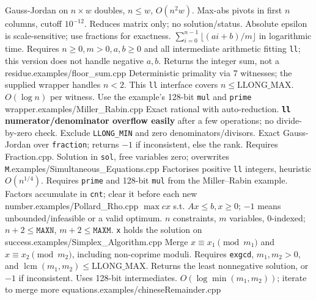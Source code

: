 {Gauss-Jordan on $n\times w$ doubles, $n\le w$, $O(n^2w)$. Max-abs pivots in first $n$ columns, cutoff $10^{-12}$. Reduces matrix only; no solution/status. Absolute epsilon is scale-sensitive; use fractions for exactness.}
%
{$\sum_{i=0}^{n-1}\lfloor(ai+b)/m\rfloor$ in logarithmic time. Requires $n\ge0,m>0,a,b\ge0$ and all intermediate arithmetic fitting \texttt{ll}; this version does not handle negative $a,b$. Returns the integer sum, not a residue.}{examples/floor_sum.cpp}
%
{Deterministic primality via 7 witnesses; the supplied wrapper handles $n<2$. This \texttt{ll} interface covers $n\le\mathrm{LLONG\_MAX}$. $O(\log n)$ per witness. Use the example's 128-bit \texttt{mul} and \texttt{prime} wrapper.}{examples/Miller_Rabin.cpp}
%
{Exact rational with auto-reduction. \textbf{\texttt{ll} numerator/denominator overflow easily} after a few operations; no divide-by-zero check. Exclude \texttt{LLONG\_MIN} and zero denominators/divisors.}
%
{Exact Gauss-Jordan over \texttt{fraction}; returns $-1$ if inconsistent, else the rank. Requires Fraction.cpp. Solution in \texttt{sol}, free variables zero; overwrites \texttt{M}.}{examples/Simultaneous_Equations.cpp}
%
{Factorises positive \texttt{ll} integers, heuristic $O(n^{1/4})$. Requires \texttt{prime} and 128-bit \texttt{mul} from the Miller--Rabin example. Factors accumulate in \texttt{cnt}; clear it before each new number.}{examples/Pollard_Rho.cpp}
%
{$\max cx$ s.t. $Ax\le b,x\ge0$; $-1$ means unbounded/infeasible or a valid optimum. $n$ constraints, $m$ variables, 0-indexed; $n+2\le\texttt{MAXN}$, $m+2\le\texttt{MAXM}$. \texttt{x} holds the solution on success.}{examples/Simplex_Algorithm.cpp}
%
{Merge $x\equiv x_1\pmod{m_1}$ and $x\equiv x_2\pmod{m_2}$, including non-coprime moduli. Requires \texttt{exgcd}, $m_1,m_2>0$, and $\operatorname{lcm}(m_1,m_2)\le\mathrm{LLONG\_MAX}$. Returns the least nonnegative solution, or $-1$ if inconsistent. Uses 128-bit intermediates. $O(\log\min(m_1,m_2))$; iterate to merge more equations.}{examples/chineseRemainder.cpp}
%
